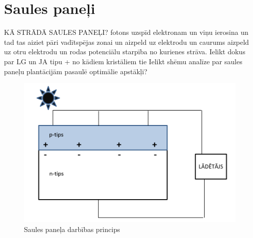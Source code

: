 \section{Saules paneļi}
KĀ STRĀDĀ SAULES PANEĻI?
fotons uzspīd elektronam un viņu ierosina un tad tas aiziet pāri vadītspējas zonai un aizpeld uz elektrodu un caurums aizpeld uz otru elektrodu un rodas potenciālu starpība no kurienes strāva.
Ielikt dokus par LG un JA tipu + no kādiem kristāliem tie
Ielikt shēmu
analīze par saules paneļu plantācijām pasaulē
optimālie apstākļi?



\begin{figure}[h]
    \centering
    \includegraphics[width=0.7\linewidth]{figures/misc/solar_cell.pdf}
    \caption{Saules paneļa darbības princips}
    \label{fig:PV}
\end{figure}
